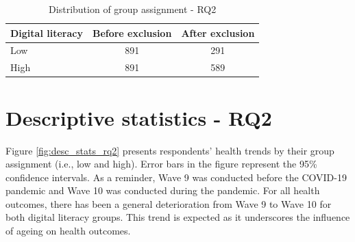 \begin{table}[h!]
    \centering
    \caption{Distribution of group assignment - RQ2}
    \label{tab:explanatory_variable_rq2}
    \begin{tabular}{lcc}
        \toprule
        Digital literacy & Before exclusion & After exclusion \\
        \midrule
        Low & 891 & 291 \\
        High & 891 & 589 \\
        \bottomrule
    \end{tabular}
\end{table}

\section{Descriptive statistics - RQ2}
Figure \ref{fig:desc_stats_rq2} presents respondents' health trends by their group assignment (i.e., low and high). Error bars in the figure represent the 95\% confidence intervals. As a reminder, Wave 9 was conducted before the COVID-19 pandemic and Wave 10 was conducted during the pandemic. For all health outcomes, there has been a general deterioration from Wave 9 to Wave 10 for both digital literacy groups. This trend is expected as it underscores the influence of ageing on health outcomes.

